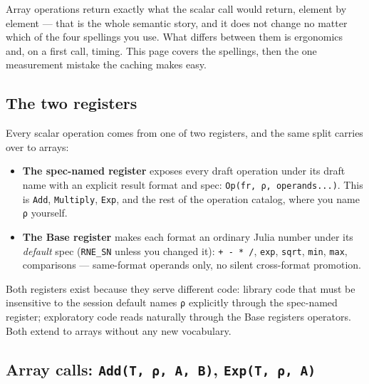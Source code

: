 \label{5276441852382874800}{}


Array operations return exactly what the scalar call would return, element by element — that is the whole semantic story, and it does not change no matter which of the four spellings you use. What differs between them is ergonomics and, on a first call, timing. This page covers the spellings, then the one measurement mistake the caching makes easy.



\subsection{The two registers}



\label{15376150770468113770}{}


Every scalar operation comes from one of two registers, and the same split carries over to arrays:



\begin{itemize}
\item \textbf{The spec-named register} exposes every draft operation under its draft name with an explicit result format and spec: \texttt{Op(fr, ρ, operands...)}. This is \texttt{Add}, \texttt{Multiply}, \texttt{Exp}, and the rest of the operation catalog, where you name \texttt{ρ} yourself.


\item \textbf{The Base register} makes each format an ordinary Julia number under its \emph{default} spec (\texttt{RNE\_\allowbreak{}SN} unless you changed it): \texttt{+ - * /}, \texttt{exp}, \texttt{sqrt}, \texttt{min}, \texttt{max}, comparisons — same-format operands only, no silent cross-format promotion.

\end{itemize}


Both registers exist because they serve different code: library code that must be insensitive to the session default names \texttt{ρ} explicitly through the spec-named register; exploratory code reads naturally through the Base register{\textquotesingle}s operators. Both extend to arrays without any new vocabulary.



\subsection{Array calls: \texttt{Add(T, ρ, A, B)}, \texttt{Exp(T, ρ, A)}}



